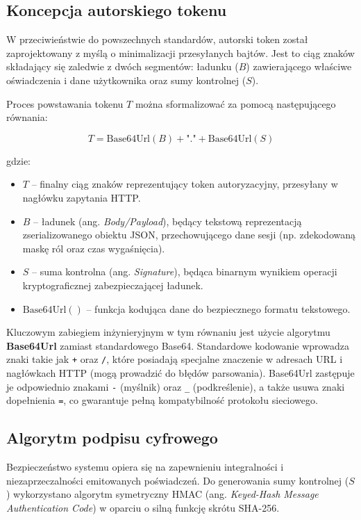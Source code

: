 \documentclass{SGGW-thesis}
\begin{document}
\subsection{Koncepcja autorskiego tokenu}

W przeciwieństwie do powszechnych standardów, autorski token został zaprojektowany z myślą o minimalizacji przesyłanych bajtów. Jest to ciąg znaków składający się zaledwie z dwóch segmentów: ładunku ($B$) zawierającego właściwe oświadczenia i dane użytkownika oraz sumy kontrolnej ($S$). 

Proces powstawania tokenu $T$ można sformalizować za pomocą następującego równania:

$$ T = \text{Base64Url}(B) + \text{"."} + \text{Base64Url}(S) $$

gdzie:
\begin{itemize}
    \item $T$ – finalny ciąg znaków reprezentujący token autoryzacyjny, przesyłany w nagłówku zapytania HTTP.
    \item $B$ – ładunek (ang. \textit{Body/Payload}), będący tekstową reprezentacją zserializowanego obiektu JSON, przechowującego dane sesji (np. zdekodowaną maskę ról oraz czas wygaśnięcia).
    \item $S$ – suma kontrolna (ang. \textit{Signature}), będąca binarnym wynikiem operacji kryptograficznej zabezpieczającej ładunek.
    \item $\text{Base64Url}()$ – funkcja kodująca dane do bezpiecznego formatu tekstowego.
\end{itemize}

Kluczowym zabiegiem inżynieryjnym w tym równaniu jest użycie algorytmu \textbf{Base64Url} zamiast standardowego Base64. Standardowe kodowanie wprowadza znaki takie jak \texttt{+} oraz \texttt{/}, które posiadają specjalne znaczenie w adresach URL i nagłówkach HTTP (mogą prowadzić do błędów parsowania). Base64Url zastępuje je odpowiednio znakami \texttt{-} (myślnik) oraz \texttt{\_} (podkreślenie), a także usuwa znaki dopełnienia \texttt{=}, co gwarantuje pełną kompatybilność protokołu sieciowego.

\subsection{Algorytm podpisu cyfrowego}

Bezpieczeństwo systemu opiera się na zapewnieniu integralności i niezaprzeczalności emitowanych poświadczeń. Do generowania sumy kontrolnej ($S$) wykorzystano algorytm symetryczny HMAC (ang. \textit{Keyed-Hash Message Authentication Code}) w oparciu o silną funkcję skrótu SHA-256. 
\end{document}

